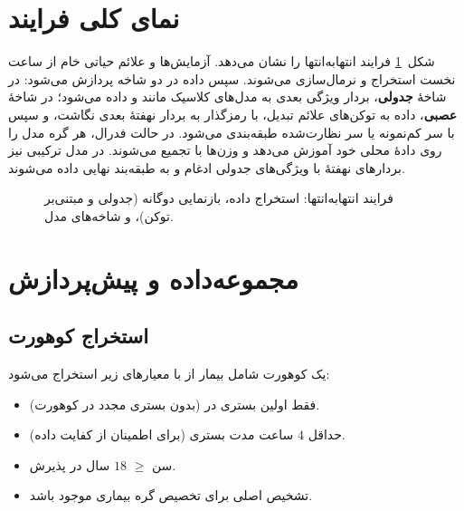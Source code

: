 \section{نمای کلی فرایند}

شکل~\ref{fig:pipeline} فرایند انتهابه‌انتها را نشان می‌دهد. آزمایش‌ها و علائم حیاتی خام از  ساعت نخست  استخراج و نرمال‌سازی می‌شوند. سپس داده در دو شاخه پردازش می‌شود: در شاخۀ \textbf{جدولی}، بردار ویژگی بعدی به مدل‌های کلاسیک مانند  و  داده می‌شود؛ در شاخۀ \textbf{عصبی}، داده به توکن‌های علائم تبدیل، با رمزگذار  به بردار نهفتۀ بعدی نگاشت، و سپس با سر کم‌نمونه یا سر نظارت‌شده طبقه‌بندی می‌شود. در حالت فدرال، هر گره مدل را روی دادۀ محلی خود آموزش می‌دهد و وزن‌ها با  تجمیع می‌شوند. در مدل ترکیبی نیز بردارهای نهفتۀ  با ویژگی‌های جدولی ادغام و به طبقه‌بند نهایی  داده می‌شوند.

\begin{figure}[htbp]
\centering
{}
\caption{فرایند انتهابه‌انتها: استخراج داده، بازنمایی دوگانه (جدولی و مبتنی‌بر توکن)، و شاخه‌های مدل.}
\label{fig:pipeline}
\end{figure}

\section{مجموعه‌داده و پیش‌پردازش}

\subsection{استخراج کوهورت}

یک کوهورت شامل  بیمار از  با معیارهای زیر استخراج می‌شود:
\begin{itemize}
\item فقط اولین بستری در  (بدون بستری مجدد در کوهورت).
\item حداقل $4$ ساعت مدت بستری (برای اطمینان از کفایت داده).
\item سن $\geq$ $18$ سال در پذیرش.
\item تشخیص اصلی  برای تخصیص گره بیماری موجود باشد.
\end{itemize}

